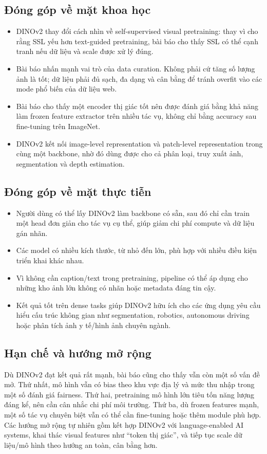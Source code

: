\subsection{Đóng góp về mặt khoa học}
\begin{itemize}
    \item DINOv2 thay đổi cách nhìn về self-supervised visual pretraining: thay vì cho rằng SSL yếu hơn text-guided pretraining, bài báo cho thấy SSL có thể cạnh tranh nếu dữ liệu và scale được xử lý đúng.
    \item Bài báo nhấn mạnh vai trò của data curation. Không phải cứ tăng số lượng ảnh là tốt; dữ liệu phải đủ sạch, đa dạng và cân bằng để tránh overfit vào các mode phổ biến của dữ liệu web.
    \item Bài báo cho thấy một encoder thị giác tốt nên được đánh giá bằng khả năng làm frozen feature extractor trên nhiều tác vụ, không chỉ bằng accuracy sau fine-tuning trên ImageNet.
    \item DINOv2 kết nối image-level representation và patch-level representation trong cùng một backbone, nhờ đó dùng được cho cả phân loại, truy xuất ảnh, segmentation và depth estimation.
\end{itemize}

\subsection{Đóng góp về mặt thực tiễn}
\begin{itemize}
    \item Người dùng có thể lấy DINOv2 làm backbone có sẵn, sau đó chỉ cần train một head đơn giản cho tác vụ cụ thể, giúp giảm chi phí compute và dữ liệu gán nhãn.
    \item Các model có nhiều kích thước, từ nhỏ đến lớn, phù hợp với nhiều điều kiện triển khai khác nhau.
    \item Vì không cần caption/text trong pretraining, pipeline có thể áp dụng cho những kho ảnh lớn không có nhãn hoặc metadata đáng tin cậy.
    \item Kết quả tốt trên dense tasks giúp DINOv2 hữu ích cho các ứng dụng yêu cầu hiểu cấu trúc không gian như segmentation, robotics, autonomous driving hoặc phân tích ảnh y tế/hình ảnh chuyên ngành.
\end{itemize}

\subsection{Hạn chế và hướng mở rộng}
Dù DINOv2 đạt kết quả rất mạnh, bài báo cũng cho thấy vẫn còn một số vấn đề mở. Thứ nhất, mô hình vẫn có bias theo khu vực địa lý và mức thu nhập trong một số đánh giá fairness. Thứ hai, pretraining mô hình lớn tiêu tốn năng lượng đáng kể, nên cần cân nhắc chi phí môi trường. Thứ ba, dù frozen features mạnh, một số tác vụ chuyên biệt vẫn có thể cần fine-tuning hoặc thêm module phù hợp. Các hướng mở rộng tự nhiên gồm kết hợp DINOv2 với language-enabled AI systems, khai thác visual features như “token thị giác”, và tiếp tục scale dữ liệu/mô hình theo hướng an toàn, cân bằng hơn.

